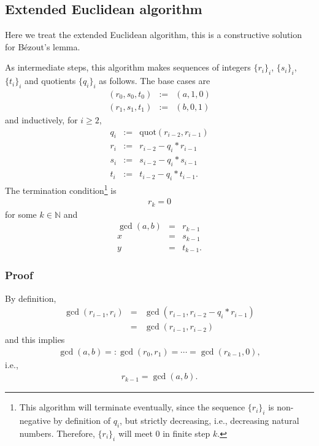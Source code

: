 \documentclass[11pt]{book}
\begin{document}
\subsection{Extended Euclidean algorithm}
\label{exGCD}
Here we treat the extended Euclidean algorithm, this is a constructive solution for B\'ezout's lemma.

As intermediate steps, this algorithm makes sequences of integers $\{r_i\}_i$, $\{s_i\}_i$, $\{t_i\}_i$ and quotients $\{q_i\}_i$ as follows.
The base cases are
\begin{eqnarray}
\left(r_0, s_0, t_0 \right) &:=& (a,1,0) \\
\left(r_1, s_1, t_1 \right) &:=& (b,0,1) 
\end{eqnarray}
and inductively, for $i \geq 2$,
\begin{eqnarray}
q_i &:=& \text{quot}(r_{i-2}, r_{i-1}) \\
r_i &:=& r_{i-2} - q_i * r_{i-1} \\
s_i &:=& s_{i-2} - q_i * s_{i-1} \\
t_i &:=& t_{i-2} - q_i * t_{i-1}.
\end{eqnarray}
The termination condition\footnote{
This algorithm will terminate eventually, since the sequence $\{r_i\}_i$ is non-negative by definition of $q_i$, but strictly decreasing, i.e., decreasing natural numbers.
Therefore, $\{r_i\}_i$ will meet $0$ in finite step $k$.
} is
\begin{eqnarray}
r_k = 0
\end{eqnarray}
for some $k \in \mathbb{N}$ and
\begin{eqnarray}
\gcd(a,b) &=& r_{k-1} \\
x &=& s_{k-1} \\
y &=& t_{k-1}.
\end{eqnarray}

\subsubsection{Proof}
By definition,
\begin{eqnarray}
\gcd(r_{i-1}, r_i) &=& \gcd(r_{i-1}, r_{i-2} - q_i * r_{i-1}) \\
&=& \gcd(r_{i-1}, r_{i-2})
\end{eqnarray}
and this implies 
\begin{eqnarray}
\gcd(a,b) =: \gcd(r_0, r_1) = \cdots = \gcd(r_{k-1}, 0),
\end{eqnarray}
i.e., 
\begin{eqnarray}
r_{k-1} = \gcd(a,b).
\end{eqnarray}
\end{document}
